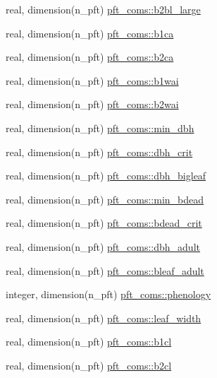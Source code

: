 \begin{DoxyCompactItemize}
real, dimension(n\+\_\+pft) \hyperlink{namespacepft__coms_a3047801affde1c1d10ddb8ceed1e6cb7}{pft\+\_\+coms\+::b2bl\+\_\+large}
\item 
real, dimension(n\+\_\+pft) \hyperlink{namespacepft__coms_a56ccfd1fc49345702eb25a9a9f4a5756}{pft\+\_\+coms\+::b1ca}
\item 
real, dimension(n\+\_\+pft) \hyperlink{namespacepft__coms_a2380072ccb1b4557283c4f7d44398c9c}{pft\+\_\+coms\+::b2ca}
\item 
real, dimension(n\+\_\+pft) \hyperlink{namespacepft__coms_ad8ddc641c836a1062e3157400b675217}{pft\+\_\+coms\+::b1wai}
\item 
real, dimension(n\+\_\+pft) \hyperlink{namespacepft__coms_a31ab705538ba69a865a41647d0bd5d63}{pft\+\_\+coms\+::b2wai}
\item 
real, dimension(n\+\_\+pft) \hyperlink{namespacepft__coms_a6290d41cd79d6f8ac7819f9bf06cad60}{pft\+\_\+coms\+::min\+\_\+dbh}
\item 
real, dimension(n\+\_\+pft) \hyperlink{namespacepft__coms_a39e1c4892ebafc9be2ac78b48d954d5c}{pft\+\_\+coms\+::dbh\+\_\+crit}
\item 
real, dimension(n\+\_\+pft) \hyperlink{namespacepft__coms_a86747c6ee955a89a55612d189bf255f8}{pft\+\_\+coms\+::dbh\+\_\+bigleaf}
\item 
real, dimension(n\+\_\+pft) \hyperlink{namespacepft__coms_af689fc3f0c233590c72175bf99d1c8f6}{pft\+\_\+coms\+::min\+\_\+bdead}
\item 
real, dimension(n\+\_\+pft) \hyperlink{namespacepft__coms_a321291df889682b63b1a09ff1affff18}{pft\+\_\+coms\+::bdead\+\_\+crit}
\item 
real, dimension(n\+\_\+pft) \hyperlink{namespacepft__coms_a5dbaccf1767dc343b4dca7f5e25f358b}{pft\+\_\+coms\+::dbh\+\_\+adult}
\item 
real, dimension(n\+\_\+pft) \hyperlink{namespacepft__coms_a032c88698720a94f7bdeff271ae39844}{pft\+\_\+coms\+::bleaf\+\_\+adult}
\item 
integer, dimension(n\+\_\+pft) \hyperlink{namespacepft__coms_a5a3bbf23e4825378c0f3c8bd788c6c68}{pft\+\_\+coms\+::phenology}
\item 
real, dimension(n\+\_\+pft) \hyperlink{namespacepft__coms_ac9aba7609beabf8387afac8a12a89d5c}{pft\+\_\+coms\+::leaf\+\_\+width}
\item 
real, dimension(n\+\_\+pft) \hyperlink{namespacepft__coms_ad31da22766c6db6bf3f24498eab8d22d}{pft\+\_\+coms\+::b1cl}
\item 
real, dimension(n\+\_\+pft) \hyperlink{namespacepft__coms_a382f054406a23a234b101ebf06ff6d5c}{pft\+\_\+coms\+::b2cl}

\end{DoxyCompactItemize}
